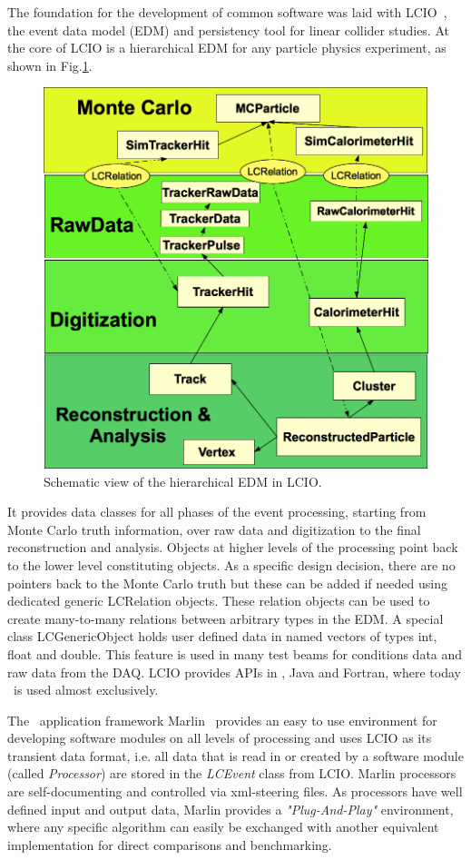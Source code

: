 The foundation for the development of common software was laid with LCIO~\cite{Gaede:2003ip}, the
event data model (EDM) and persistency tool for linear collider studies. At the core of LCIO is a hierarchical
EDM for any particle physics experiment, as shown in Fig.\ref{fig:lcio_edm}.
\begin{figure}
\begin{center}
\includegraphics[width=0.60\hsize]{chapters/figures/lcio_edm_schema.png}
\end{center}
\caption{Schematic view of the hierarchical EDM in LCIO.}
\label{fig:lcio_edm}
\end{figure}
It provides data classes for all phases of the event processing, starting from Monte Carlo truth information,
over raw data and digitization to the final reconstruction and analysis. Objects at higher levels of the processing
point back to the lower level constituting objects. As a specific design decision, there are no pointers back to the
Monte Carlo truth but these can be added if needed using dedicated generic LCRelation objects.
These relation objects can be used to create many-to-many relations between arbitrary types in the EDM.
A special class LCGenericObject holds user defined data in named vectors of types int, float and double.
This feature is used in many test beams for conditions data and raw data from the DAQ.
LCIO provides APIs in \CPP, Java and Fortran, where today \CPP\ is used almost exclusively.


The \CPP\ application framework Marlin~\cite{Gaede:2006pj} provides an easy to use environment for developing software
modules on all levels of processing and uses LCIO as its transient data format, i.e. all data that is read in or created
by a software module (called \emph{Processor}) are stored in the \emph{LCEvent} class from LCIO. Marlin processors
are self-documenting and controlled via xml-steering files. As processors have well defined input and output data, Marlin
provides a \emph{"Plug-And-Play"} environment, where any specific algorithm can easily be exchanged with another
equivalent implementation for direct comparisons and benchmarking.


